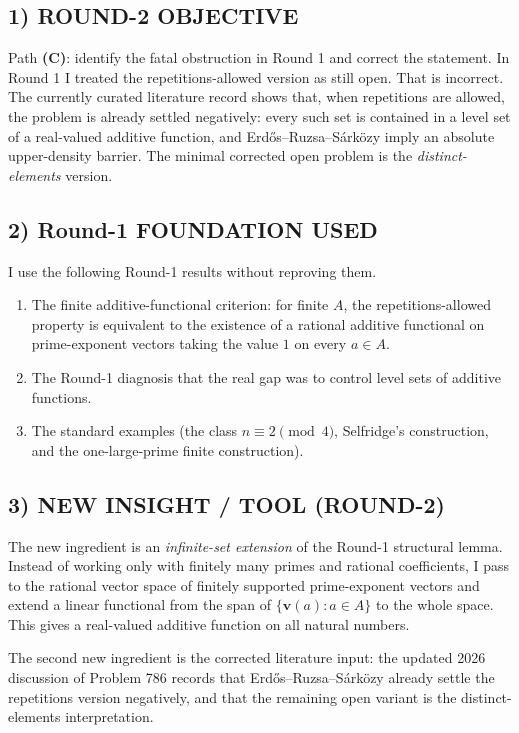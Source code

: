 \subsection*{1) ROUND-2 OBJECTIVE}
Path \textbf{(C)}: identify the fatal obstruction in Round 1 and correct the statement. In Round 1 I treated the repetitions-allowed version as still open. That is incorrect. The currently curated literature record shows that, when repetitions are allowed, the problem is already settled negatively: every such set is contained in a level set of a real-valued additive function, and Erd\H{o}s--Ruzsa--S\'ark\"ozy imply an absolute upper-density barrier. The minimal corrected open problem is the \emph{distinct-elements} version.

\subsection*{2) Round-1 FOUNDATION USED}
I use the following Round-1 results without reproving them.
\begin{enumerate}
\item The finite additive-functional criterion: for finite $A$, the repetitions-allowed property is equivalent to the existence of a rational additive functional on prime-exponent vectors taking the value $1$ on every $a \in A$.
\item The Round-1 diagnosis that the real gap was to control level sets of additive functions.
\item The standard examples (the class $n \equiv 2 \pmod 4$, Selfridge's construction, and the one-large-prime finite construction).
\end{enumerate}

\subsection*{3) NEW INSIGHT / TOOL (ROUND-2)}
The new ingredient is an \emph{infinite-set extension} of the Round-1 structural lemma. Instead of working only with finitely many primes and rational coefficients, I pass to the rational vector space of finitely supported prime-exponent vectors and extend a linear functional from the span of $\{\mathbf v(a): a \in A\}$ to the whole space. This gives a real-valued additive function on all natural numbers.

The second new ingredient is the corrected literature input: the updated 2026 discussion of Problem 786 records that Erd\H{o}s--Ruzsa--S\'ark\"ozy already settle the repetitions version negatively, and that the remaining open variant is the distinct-elements interpretation.

